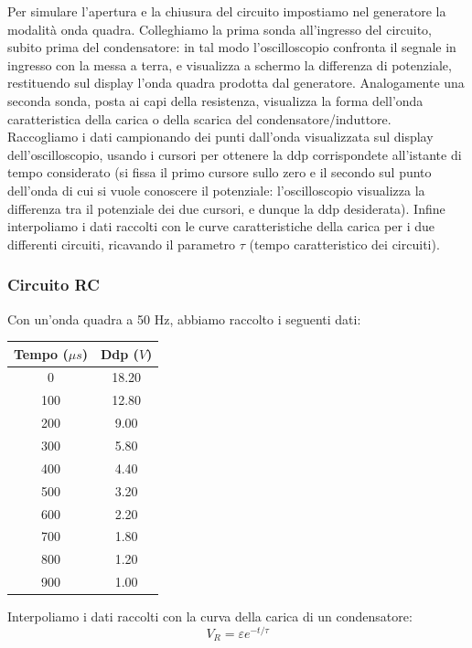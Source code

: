 Per simulare l'apertura e la chiusura del circuito impostiamo nel generatore la modalità onda quadra. Colleghiamo la prima sonda all'ingresso del circuito, subito prima del condensatore: in tal modo l'oscilloscopio confronta il segnale in ingresso con la messa a terra, e visualizza a schermo la differenza di potenziale, restituendo sul display l'onda quadra prodotta dal generatore.  
Analogamente una seconda sonda, posta ai capi della resistenza, visualizza la forma dell'onda caratteristica della carica o della scarica del condensatore/induttore. \\
Raccogliamo i dati campionando dei punti dall'onda visualizzata sul display dell'oscilloscopio, usando i cursori per ottenere la ddp corrispondete all'istante di tempo considerato (si fissa il primo cursore sullo zero e il secondo sul punto dell'onda di cui si vuole conoscere il potenziale: l'oscilloscopio visualizza la differenza tra il potenziale dei due cursori, e dunque la ddp desiderata).
Infine interpoliamo i dati raccolti con le curve caratteristiche della carica per i due differenti circuiti, ricavando il parametro $\tau$ (tempo caratteristico dei circuiti).

\subsubsection{Circuito RC}
Con un'onda quadra a 50 Hz, abbiamo raccolto i seguenti dati:

\begin{center}
\begin{tabular}{*{2}{c}}
Tempo ($\mu s$) & Ddp ($V$) \\
\midrule
0 & 18.20 \\
100 & 12.80 \\
200 & 9.00 \\
300 & 5.80 \\
400 & 4.40 \\
500 & 3.20 \\
600 & 2.20 \\
700 & 1.80 \\
800 & 1.20 \\
900 & 1.00 \\
\end{tabular}
\end{center}

Interpoliamo i dati raccolti con la curva della carica di un condensatore: 
$$V_R = \varepsilon e^{-t/\tau}$$


